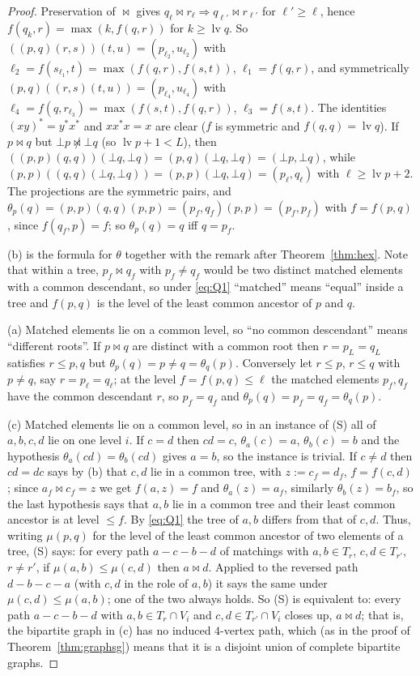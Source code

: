 \documentclass[11pt]{amsart}
\theoremstyle{definition}
\begin{document}
\begin{proof}
Preservation of $\bowtie$ gives $q_\ell\bowtie r_\ell\Rightarrow q_{\ell'}\bowtie r_{\ell'}$ for $\ell'\ge\ell$, hence $f(q_k,r)=\max(k,f(q,r))$ for $k\ge\operatorname{lv}q$. So $((p,q)(r,s))(t,u)=(p_{\ell_2},u_{\ell_2})$ with $\ell_2=f(s_{\ell_1},t)=\max(f(q,r),f(s,t))$, $\ell_1=f(q,r)$, and symmetrically $(p,q)((r,s)(t,u))=(p_{\ell_4},u_{\ell_4})$ with $\ell_4=f(q,r_{\ell_3})=\max(f(s,t),f(q,r))$, $\ell_3=f(s,t)$. The identities $(xy)^*=y^*x^*$ and $xx^*x=x$ are clear ($f$ is symmetric and $f(q,q)=\operatorname{lv}q$). If $p\bowtie q$ but $\bot p\not\bowtie\bot q$ (so $\operatorname{lv}p+1<L$), then $((p,p)(q,q))(\bot q,\bot q)=(p,q)(\bot q,\bot q)=(\bot p,\bot q)$, while $(p,p)((q,q)(\bot q,\bot q))=(p,p)(\bot q,\bot q)=(p_\ell,q_\ell)$ with $\ell\ge\operatorname{lv}p+2$. The projections are the symmetric pairs, and $\theta_p(q)=(p,p)(q,q)(p,p)=(p_f,q_f)(p,p)=(p_f,p_f)$ with $f=f(p,q)$, since $f(q_f,p)=f$; so $\theta_p(q)=q$ iff $q=p_f$.

(b) is the formula for $\theta$ together with the remark after Theorem~\ref{thm:hex}. Note that within a tree, $p_f\bowtie q_f$ with $p_f\ne q_f$ would be two distinct matched elements with a common descendant, so under \eqref{eq:Q1} ``matched'' means ``equal'' inside a tree and $f(p,q)$ is the level of the least common ancestor of $p$ and $q$.

(a) Matched elements lie on a common level, so ``no common descendant'' means ``different roots''. If $p\bowtie q$ are distinct with a common root then $r=p_L=q_L$ satisfies $r\le p,q$ but $\theta_p(q)=p\ne q=\theta_q(p)$. Conversely let $r\le p$, $r\le q$ with $p\ne q$, say $r=p_\ell=q_\ell$; at the level $f=f(p,q)\le\ell$ the matched elements $p_f,q_f$ have the common descendant $r$, so $p_f=q_f$ and $\theta_p(q)=p_f=q_f=\theta_q(p)$.

(c) Matched elements lie on a common level, so in an instance of (S) all of $a,b,c,d$ lie on one level $i$. If $c=d$ then $cd=c$, $\theta_a(c)=a$, $\theta_b(c)=b$ and the hypothesis $\theta_a(cd)=\theta_b(cd)$ gives $a=b$, so the instance is trivial. If $c\ne d$ then $cd=dc$ says by (b) that $c,d$ lie in a common tree, with $z:=c_f=d_f$, $f=f(c,d)$; since $a_f\bowtie c_f=z$ we get $f(a,z)=f$ and $\theta_a(z)=a_f$, similarly $\theta_b(z)=b_f$, so the last hypothesis says that $a,b$ lie in a common tree and their least common ancestor is at level $\le f$. By \eqref{eq:Q1} the tree of $a,b$ differs from that of $c,d$. Thus, writing $\mu(p,q)$ for the level of the least common ancestor of two elements of a tree, (S) says: for every path $a-c-b-d$ of matchings with $a,b\in T_r$, $c,d\in T_{r'}$, $r\ne r'$, if $\mu(a,b)\le\mu(c,d)$ then $a\bowtie d$. Applied to the reversed path $d-b-c-a$ (with $c,d$ in the role of $a,b$) it says the same under $\mu(c,d)\le\mu(a,b)$; one of the two always holds. So (S) is equivalent to: every path $a-c-b-d$ with $a,b\in T_r\cap V_i$ and $c,d\in T_{r'}\cap V_i$ closes up, $a\bowtie d$; that is, the bipartite graph in (c) has no induced $4$-vertex path, which (as in the proof of Theorem~\ref{thm:graphsg}) means that it is a disjoint union of complete bipartite graphs.


\end{proof}
\end{document}
